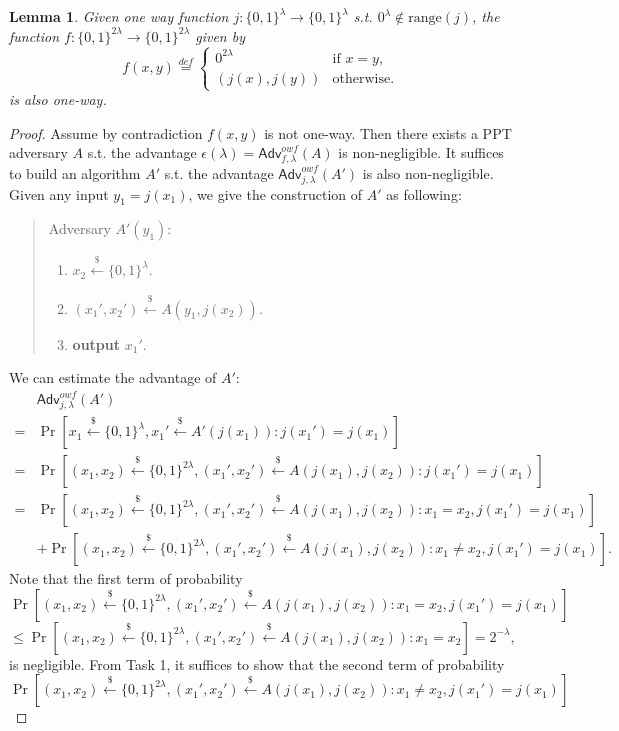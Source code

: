 \documentclass[12pt]{article}
\newcommand{\eqdef}{\stackrel{def}{=}}
\newcommand{\bits}{\{0,1\}}
\newcommand{\getsr}{\stackrel{\$}{\gets}}
\newcommand{\Adv}{\textsf{Adv}}
\newtheorem{lemma}[theorem]{Lemma}
\theoremstyle{definition}
\begin{document}
\begin{lemma}
Given one way function $j : \bits^\lambda \to \bits^\lambda$ s.t. $0^\lambda \not\in \mathrm{range}(j)$, the function $f : \bits^{2\lambda} \to \bits^{2\lambda}$ given by
$$f(x,y) \eqdef
\begin{cases}
0^{2\lambda} & \textrm{if $x=y$,} \\
(j(x),j(y)) & \textrm{otherwise.}
\end{cases}$$
is also one-way.
\end{lemma}
\begin{proof}
Assume by contradiction $f(x,y)$ is not one-way. Then there exists a PPT adversary $A$ s.t. the advantage $\epsilon(\lambda) = \Adv_{f,\lambda}^{owf}(A)$ is non-negligible. It suffices to build an algorithm $A'$ s.t. the advantage $\Adv_{j,\lambda}^{owf}(A')$ is also non-negligible. Given any input $y_1 = j(x_1)$, we give the construction of $A'$ as following:
\begin{quote}
Adversary $A' (y_1)$:
\begin{enumerate}
\item $x_2 \getsr \bits^\lambda$.
\item $(x_1',x_2') \getsr A(y_1,j(x_2))$.
\item {\bf output} $x_1'$.
\end{enumerate}
\end{quote} 
We can estimate the advantage of $A'$:
$$
\begin{aligned}
&\Adv_{j,\lambda}^{owf}(A') \\
=& \Pr[x_1 \getsr \bits^\lambda, x_1' \getsr A'(j(x_1)) : j(x_1') = j(x_1)] \\
=& \Pr[(x_1, x_2) \getsr \bits^{2\lambda}, (x_1', x_2') \getsr A(j(x_1),j(x_2)) : j(x_1') = j(x_1)] \\
=& \Pr[(x_1, x_2) \getsr \bits^{2\lambda}, (x_1', x_2') \getsr A(j(x_1),j(x_2)) : x_1=x_2, j(x_1') = j(x_1)] \\
&+\Pr[(x_1, x_2) \getsr \bits^{2\lambda}, (x_1', x_2') \getsr A(j(x_1),j(x_2)) : x_1\not=x_2, j(x_1') = j(x_1)].
\end{aligned}
$$
Note that the first term of probability 
$$\Pr[(x_1, x_2) \getsr \bits^{2\lambda}, (x_1', x_2') \getsr A(j(x_1),j(x_2)) : x_1=x_2, j(x_1') = j(x_1)]$$
$$\leq \Pr[(x_1, x_2) \getsr \bits^{2\lambda}, (x_1', x_2') \getsr A(j(x_1),j(x_2)) : x_1=x_2] = 2^{-\lambda},$$
is negligible. From Task 1, it suffices to show that the second term of probability
$$\Pr[(x_1, x_2) \getsr \bits^{2\lambda}, (x_1', x_2') \getsr A(j(x_1),j(x_2)) : x_1\not=x_2, j(x_1') = j(x_1)]$$

\end{proof}
\end{document}
